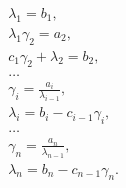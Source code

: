 \documentclass[11pt, a4paper]{article}
\begin{document}
    \begin{equation*}
      \begin{align}
        &\lambda_1 = b_1, \\
        &\lambda_1\gamma_2 = a_2, \\
        &c_1\gamma_2 + \lambda_2 = b_2, \\
        &\dots \\
        &\gamma_i = \frac{a_{i}}{\lambda_{i-1}}, \\
        &\lambda_i = b_i - c_{i-1}\gamma_i, \\
        &\dots \\
        &\gamma_n = \frac{a_n}{\lambda_{n-1}}, \\
        &\lambda_n = b_n - c_{n-1}\gamma_n.
      \end{align}
    \end{equation*}
  
\end{document}
